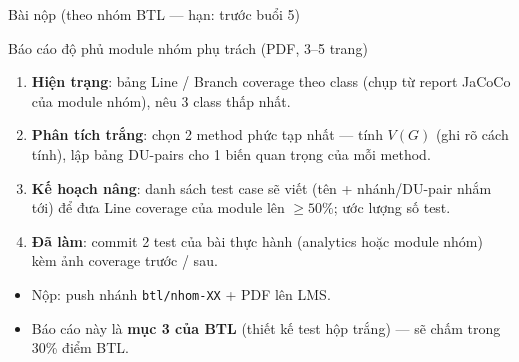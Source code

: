 \documentclass[aspectratio=169,12pt]{beamer}
\begin{document}
\begin{frame}{Bài nộp (theo nhóm BTL --- hạn: trước buổi 5)}
  \begin{block}{Báo cáo độ phủ module nhóm phụ trách (PDF, 3--5 trang)}
    \begin{enumerate}
      \item \textbf{Hiện trạng}: bảng Line / Branch coverage theo class
            (chụp từ report JaCoCo của module nhóm), nêu 3 class
            thấp nhất.
      \item \textbf{Phân tích trắng}: chọn 2 method phức tạp nhất ---
            tính $V(G)$ (ghi rõ cách tính), lập bảng DU-pairs cho
            1 biến quan trọng của mỗi method.
      \item \textbf{Kế hoạch nâng}: danh sách test case sẽ viết
            (tên + nhánh/DU-pair nhắm tới) để đưa Line coverage
            của module lên $\geq 50\%$; ước lượng số test.
      \item \textbf{Đã làm}: commit 2 test của bài thực hành
            (analytics hoặc module nhóm) kèm ảnh coverage trước / sau.
    \end{enumerate}
  \end{block}

  \begin{itemize}
    \item Nộp: push nhánh \texttt{btl/nhom-XX} + PDF lên LMS.
    \item Báo cáo này là \textbf{mục 3 của BTL} (thiết kế test hộp trắng)
          --- sẽ chấm trong 30\% điểm BTL.
  \end{itemize}
\end{frame}
\end{document}
